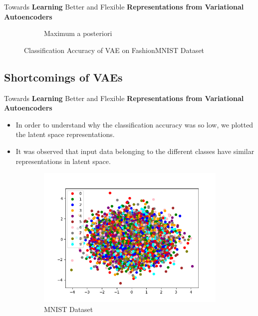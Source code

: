 \documentclass[hyperref={colorlinks,citecolor=blue,linkcolor=blue,urlcolor=blue}]{beamer}
\begin{document}
\begin{frame}{ Towards \textbf{Learning} Better and Flexible \textbf{Representations from Variational Autoencoders} \vspace{0.3em}}
\begin{figure}
\begin{subfigure}[b]{0.4\textwidth}
        \caption{Maximum a posteriori}
    \end{subfigure}
    \caption{Classification Accuracy of VAE on FashionMNIST Dataset}
  \end{figure}
\end{frame}

\subsection{Shortcomings of VAEs}

\begin{frame}{ Towards \textbf{Learning} Better and Flexible \textbf{Representations from Variational Autoencoders} \vspace{0.3em}}
  \begin{itemize}
    \item In order to understand why the classification accuracy was so low, we plotted the latent space representations.
    \item It was observed that input data belonging to the different classes have similar representations in latent space.
  \end{itemize}
  \begin{figure}
    \captionsetup{justification=centering}
    \begin{subfigure}[b]{0.4\textwidth}
        \centering
        \includegraphics[width=\textwidth,]{./Images/latent_MNIST_VAE_Sampling.png}
        \caption{MNIST Dataset}
    \end{subfigure}
    \begin{subfigure}[b]{0.4\textwidth}

\end{subfigure}
\end{figure}
\end{frame}
\end{document}
